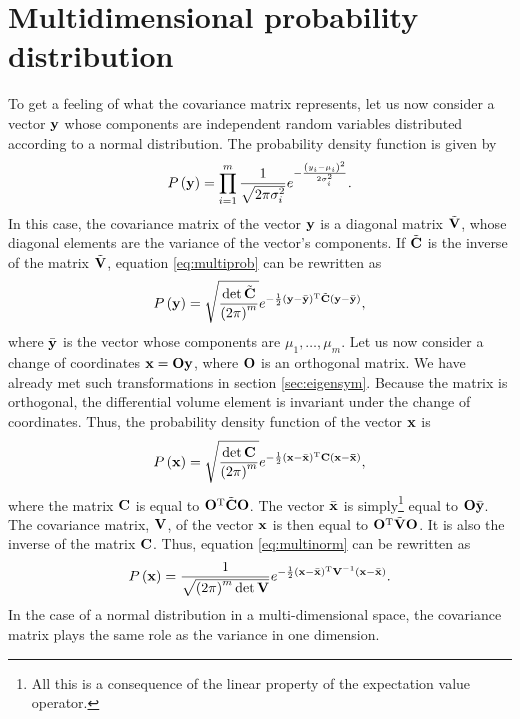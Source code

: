 \documentclass[twoside]{book}
\begin{document}
\section{Multidimensional probability distribution}
\label{sec:multiprob} To get a feeling of what the covariance
matrix represents, let us now consider a vector ${\bf y}$ whose
components are independent random variables distributed according
to a normal distribution. The probability density function is
given by
\begin{equation}
\label{eq:multiprob} P\left({\bf y}\right) = \prod_{i=1}^m{
1\over\sqrt{2\pi\sigma_i^2}}e^{-{\left(y_i-\mu_i\right)^2\over
2\sigma_i^2}}.
\end{equation}
In this case, the covariance matrix of the vector ${\bf y}$ is a
diagonal matrix $\tilde{\bf{V}}$, whose diagonal elements are the
variance of the vector's components. If $\tilde{\bf{C}}$ is the
inverse of the matrix $\tilde{\bf{V}}$, equation
\ref{eq:multiprob} can be rewritten as
\begin{equation}
P\left({\bf y}\right) =
\sqrt{{\det{\tilde{\bf{C}}}\over\left(2\pi\right)^m}}e^{-{1\over
2}\left({\bf y}-\bar{{\bf y}}\right)^{\mathop{\rm T}}
\tilde{\bf{C}}\left({\bf y}-\bar{{\bf y}}\right)},
\end{equation}
where $\bar{{\bf y}}$ is the vector whose components are
$\mu_1,\ldots,\mu_m$. Let us now consider a change of coordinates
${\bf x}={\bf O}{\bf y}$, where ${\bf O}$ is an orthogonal matrix.
We have already met such transformations in section
\ref{sec:eigensym}. Because the matrix is orthogonal, the
differential volume element is invariant under the change of
coordinates. Thus, the probability density function of the vector
${\bf x}$ is
\begin{equation}
\label{eq:multinorm} P\left({\bf x}\right) =
\sqrt{{\det{\bf{C}}\over\left(2\pi\right)^m}}e^{-{1\over
2}\left({\bf x}-\bar{{\bf x}}\right)^{\mathop{\rm T}}
\bf{C}\left({\bf x}-\bar{{\bf x}}\right)},
\end{equation}
where the matrix ${\bf C}$ is equal to ${\bf O}^{\mathop{\rm T}}\tilde{{\bf
C}}{\bf O}$. The vector $\bar{{\bf x}}$ is simply\footnote{All
this is a consequence of the linear property of the expectation
value operator.} equal to ${\bf O}\bar{{\bf y}}$. The covariance
matrix, ${\bf V}$, of the vector ${\bf x}$ is then equal to
${\bf O}^{\mathop{\rm T}}\tilde{{\bf V}}{\bf O}$. It is also the inverse of
the matrix ${\bf C}$. Thus, equation \ref{eq:multinorm} can be
rewritten as
\begin{equation}
\label{eq:multinormal} P\left({\bf x}\right) = {1
\over\sqrt{\left(2\pi\right)^m{\det{\bf V}}}}e^{-{1\over
2}\left({\bf x}-\bar{{\bf x}}\right)^{\mathop{\rm T}}
{\bf V}^{-1}\left({\bf x}-\bar{{\bf x}}\right)}.
\end{equation}
In the case of a normal distribution in a multi-dimensional space,
the covariance matrix plays the same role as the variance in one
dimension.
\end{document}
